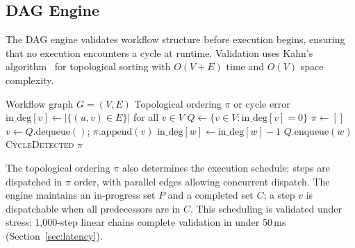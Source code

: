 \documentclass[10pt, twocolumn]{article}
\begin{document}
\subsection{DAG Engine}\label{sec:dag}

The DAG engine validates workflow structure before execution begins, ensuring that no execution encounters a cycle at runtime. Validation uses Kahn's algorithm~\cite{kahn1962} for topological sorting with $O(V + E)$ time and $O(V)$ space complexity.

\begin{algorithm}[t]
\caption{DAG Validation via Topological Sort}
\label{alg:toposort}
\begin{algorithmic}[1]
\REQUIRE Workflow graph $G = (V, E)$
\ENSURE Topological ordering $\pi$ or cycle error
\STATE $\text{in\_deg}[v] \leftarrow |\{(u,v) \in E\}|$ for all $v \in V$
\STATE $Q \leftarrow \{v \in V : \text{in\_deg}[v] = 0\}$
\STATE $\pi \leftarrow []$
  \STATE $v \leftarrow Q.\text{dequeue}()$; $\pi.\text{append}(v)$
    \STATE $\text{in\_deg}[w] \leftarrow \text{in\_deg}[w] - 1$
     \STATE $Q.\text{enqueue}(w)$ \ENDIF
  \ENDFOR
\ENDWHILE
{} \RETURN \textsc{CycleDetected} \ENDIF
\RETURN $\pi$
\end{algorithmic}
\end{algorithm}

The topological ordering $\pi$ also determines the execution schedule: steps are dispatched in $\pi$ order, with parallel edges allowing concurrent dispatch. The engine maintains an in-progress set $P$ and a completed set $C$; a step $v$ is dispatchable when all predecessors are in $C$. This scheduling is validated under stress: 1{,}000-step linear chains complete validation in under 50\,ms (Section~\ref{sec:latency}).
\end{document}
